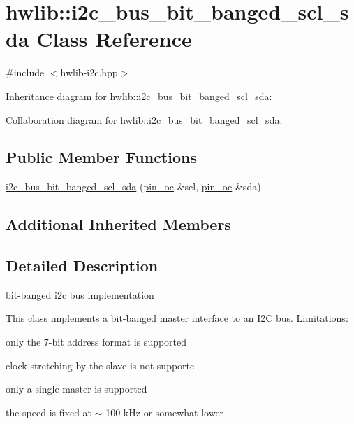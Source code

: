 \hypertarget{classhwlib_1_1i2c__bus__bit__banged__scl__sda}{}\section{hwlib\+:\+:i2c\+\_\+bus\+\_\+bit\+\_\+banged\+\_\+scl\+\_\+sda Class Reference}
\label{classhwlib_1_1i2c__bus__bit__banged__scl__sda}


{\ttfamily \#include $<$hwlib-\/i2c.\+hpp$>$}



Inheritance diagram for hwlib\+:\+:i2c\+\_\+bus\+\_\+bit\+\_\+banged\+\_\+scl\+\_\+sda\+:


Collaboration diagram for hwlib\+:\+:i2c\+\_\+bus\+\_\+bit\+\_\+banged\+\_\+scl\+\_\+sda\+:
\subsection*{Public Member Functions}
\begin{DoxyCompactItemize}
\item 
\hyperlink{classhwlib_1_1i2c__bus__bit__banged__scl__sda_aff6b11113640da8c8f04b60081bef5ae}{i2c\+\_\+bus\+\_\+bit\+\_\+banged\+\_\+scl\+\_\+sda} (\hyperlink{classhwlib_1_1pin__oc}{pin\+\_\+oc} \&scl, \hyperlink{classhwlib_1_1pin__oc}{pin\+\_\+oc} \&sda)
\end{DoxyCompactItemize}
\subsection*{Additional Inherited Members}


\subsection{Detailed Description}
bit-\/banged i2c bus implementation

This class implements a bit-\/banged master interface to an I2C bus. Limitations\+:
\begin{DoxyItemize}
\item only the 7-\/bit address format is supported
\item clock stretching by the slave is not supporte
\item only a single master is supported
\item the speed is fixed at $\sim$ 100 k\+Hz or somewhat lower 
\end{DoxyItemize}

